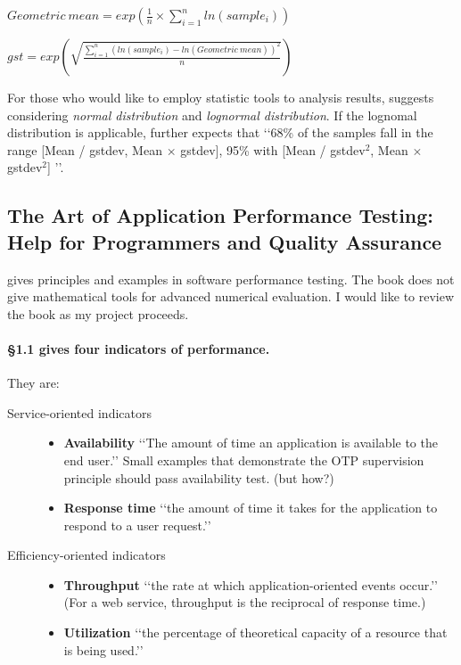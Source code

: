 \documentclass[12pt, a4paper, twoside]{article}
\begin{document}
$Geometric\ mean = exp(\frac{1}{n} \times \sum_{i=1}^{n}ln(sample_i))$

$gst = exp(\sqrt{\frac{\sum_{i=1}^{n}{(ln(sample_i)-ln(Geometric\ mean))^2}}{n}})$

For those who would like to employ statistic tools to analysis results, \cite{HePa06} suggests considering \emph{normal distribution} and \emph{lognormal distribution}.  If the lognomal distribution is applicable, \cite{HePa06} further expects that \lq\lq{}68\% of the samples fall in the range [Mean / gstdev, Mean $\times$ gstdev], 95\% with [Mean / gstdev$^{2}$, Mean $\times$ gstdev$^{2}$] \rq\rq{}.


\subsection{The Art of Application Performance Testing: Help for Programmers and Quality Assurance\cite{Ian09}} 

\cite{Ian09} gives principles and examples in software performance testing.  The book does not give mathematical tools for advanced numerical evaluation.  I would like to review the book as my project proceeds.


\paragraph{\S1.1 gives four indicators of performance. }They are:
\begin{description}
  \item[Service-oriented indicators] \hfill
  \begin{itemize}
    \item \textbf{Availability}  \lq\lq{}The amount of time an application is available to the end user.\rq\rq{}  Small examples that demonstrate the OTP supervision principle should pass availability test.  (but how?)
    \item \textbf{Response time} \lq\lq{}the amount of time it takes for the application to respond to a user request.\rq\rq{}
  \end{itemize}
  \item[Efficiency-oriented indicators] \hfill
  \begin{itemize}
    \item \textbf{Throughput} \lq\lq{}the rate at which application-oriented events occur.\rq\rq{}  (For a web service, throughput is the reciprocal of response time.)
    \item \textbf{Utilization}  \lq\lq{}the percentage of theoretical capacity of a resource that is being used.\rq\rq{}
  \end{itemize}
\end{description}
\end{document}
